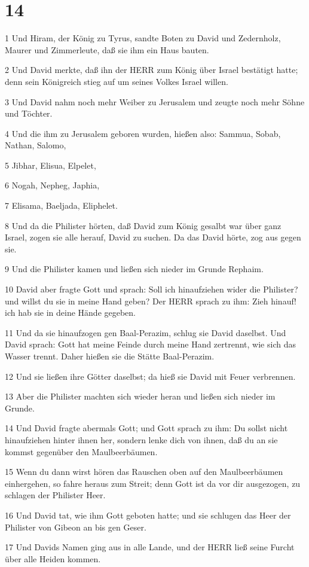 \chapter{14}

\par 1 Und Hiram, der König zu Tyrus, sandte Boten zu David und Zedernholz, Maurer und Zimmerleute, daß sie ihm ein Haus bauten.
\par 2 Und David merkte, daß ihn der HERR zum König über Israel bestätigt hatte; denn sein Königreich stieg auf um seines Volkes Israel willen.
\par 3 Und David nahm noch mehr Weiber zu Jerusalem und zeugte noch mehr Söhne und Töchter.
\par 4 Und die ihm zu Jerusalem geboren wurden, hießen also: Sammua, Sobab, Nathan, Salomo,
\par 5 Jibhar, Elisua, Elpelet,
\par 6 Nogah, Nepheg, Japhia,
\par 7 Elisama, Baeljada, Eliphelet.
\par 8 Und da die Philister hörten, daß David zum König gesalbt war über ganz Israel, zogen sie alle herauf, David zu suchen. Da das David hörte, zog aus gegen sie.
\par 9 Und die Philister kamen und ließen sich nieder im Grunde Rephaim.
\par 10 David aber fragte Gott und sprach: Soll ich hinaufziehen wider die Philister? und willst du sie in meine Hand geben? Der HERR sprach zu ihm: Zieh hinauf! ich hab sie in deine Hände gegeben.
\par 11 Und da sie hinaufzogen gen Baal-Perazim, schlug sie David daselbst. Und David sprach: Gott hat meine Feinde durch meine Hand zertrennt, wie sich das Wasser trennt. Daher hießen sie die Stätte Baal-Perazim.
\par 12 Und sie ließen ihre Götter daselbst; da hieß sie David mit Feuer verbrennen.
\par 13 Aber die Philister machten sich wieder heran und ließen sich nieder im Grunde.
\par 14 Und David fragte abermals Gott; und Gott sprach zu ihm: Du sollst nicht hinaufziehen hinter ihnen her, sondern lenke dich von ihnen, daß du an sie kommst gegenüber den Maulbeerbäumen.
\par 15 Wenn du dann wirst hören das Rauschen oben auf den Maulbeerbäumen einhergehen, so fahre heraus zum Streit; denn Gott ist da vor dir ausgezogen, zu schlagen der Philister Heer.
\par 16 Und David tat, wie ihm Gott geboten hatte; und sie schlugen das Heer der Philister von Gibeon an bis gen Geser.
\par 17 Und Davids Namen ging aus in alle Lande, und der HERR ließ seine Furcht über alle Heiden kommen.

